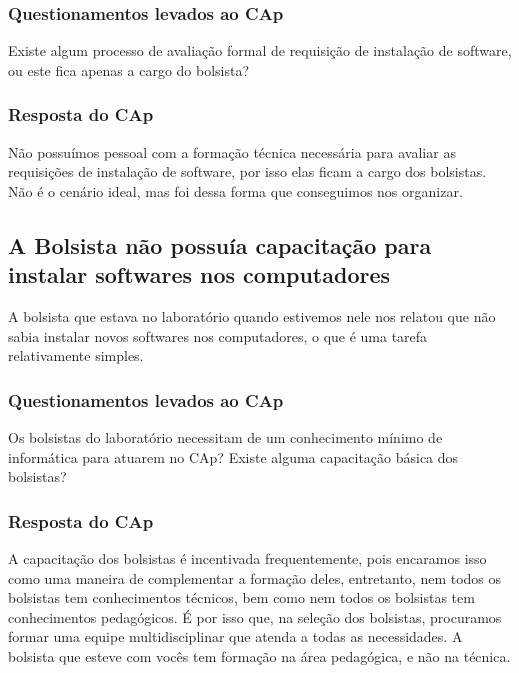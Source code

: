 \subsubsection{Questionamentos levados ao CAp}

Existe algum processo de avaliação formal de requisição de instalação de software, ou este fica apenas a cargo do bolsista?

\subsubsection{Resposta do CAp}

Não possuímos pessoal com a formação técnica necessária para avaliar as requisições de instalação de software, por isso elas ficam a cargo dos bolsistas. Não é o cenário ideal, mas foi dessa forma que conseguimos nos organizar.

\subsection{A Bolsista não possuía capacitação para instalar softwares nos computadores}\label{sec:LABEL_CHP_REL_SEC_PROBS_SUBSEC_INST_SOFT}

A bolsista que estava no laboratório quando estivemos nele nos relatou que não sabia instalar novos softwares nos computadores, o que é uma tarefa relativamente simples.

\subsubsection{Questionamentos levados ao CAp}

Os bolsistas do laboratório necessitam de um conhecimento mínimo de informática para atuarem no CAp? Existe alguma capacitação básica dos bolsistas?

\subsubsection{Resposta do CAp}

A capacitação dos bolsistas é incentivada frequentemente, pois encaramos isso como uma maneira de complementar a formação deles, entretanto, nem todos os bolsistas tem conhecimentos técnicos, bem como nem todos os bolsistas tem conhecimentos pedagógicos. É por isso que, na seleção dos bolsistas, procuramos formar uma equipe multidisciplinar que atenda a todas as necessidades. A bolsista que esteve com vocês tem formação na área pedagógica, e não na técnica.


